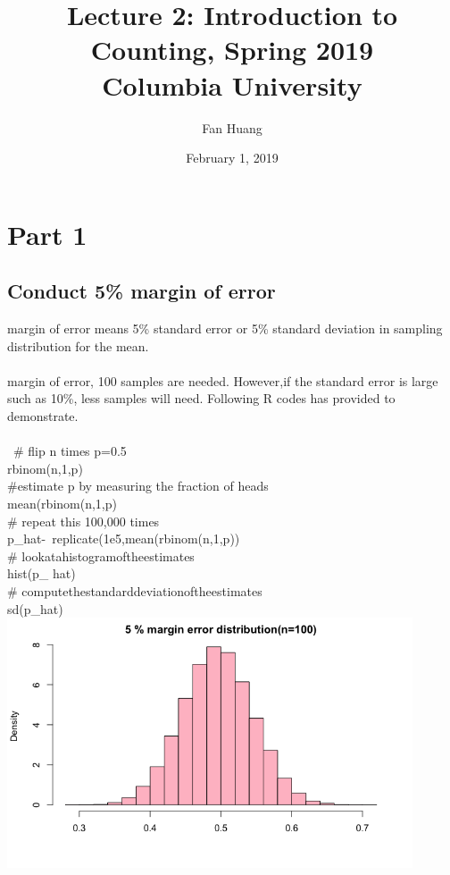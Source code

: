 \documentclass{article}
\title{
Lecture 2: Introduction to Counting, Spring 2019 \\   %
Columbia University                    %
}
\author{Fan Huang}                     %
\date{February 1, 2019}                %
\begin{document}
\maketitle
\section{Part 1}
\subsection{Conduct 5\% margin of error}
\begin{documents}
 margin of error means 5\% standard error or 5\% standard deviation in sampling distribution for the mean.
\\\\
 margin of error, 100 samples are needed. However,if the standard error is large such as 10\%, less samples will need. Following R codes has provided to demonstrate.\\\\
\ \# flip n times p=0.5
\\rbinom(n,1,p)\\
\#estimate p by measuring the fraction of heads \\
mean(rbinom(n,1,p)\\
\# repeat this 100,000 times\\
 p\_hat\<-\ replicate(1e5,mean(rbinom(n,1,p))\\
 \# look\enspace at\enspace a\enspace histogram\enspace of\enspace the\enspace estimates\\
 hist(p\_ hat)\\
 \# compute\enspace the\enspace standard\enspace deviation\enspace of\enspace the\enspace estimates\\
sd(p\_hat)\\


\includegraphics[width=12cm]{figures/ddg}

\end{documents}
\end{document}
